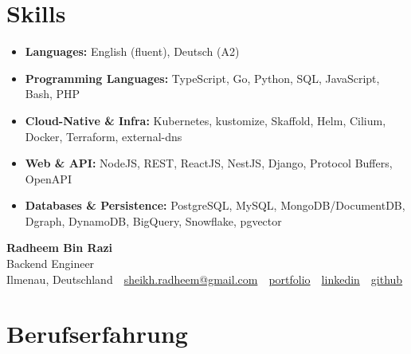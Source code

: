 \documentclass[11pt,a4paper]{resume}
\makeatletter
\newcommand{\Portfolio}{https://radheem.github.io/my-cv}
\newcommand{\PortfolioText}{portfolio}
\newcommand{\GitHub}{https://github.com/radheem}
\newcommand{\LinkedIn}{https://www.linkedin.com/in/radheem-razi}
\newcommand{\Email}{sheikh.radheem@gmail.com}
\makeatother
\begin{document}
\section{Skills}

\begin{itemize}[leftmargin=1.4em,nosep,topsep=2pt]
  \item \textbf{Languages:} English (fluent), Deutsch (A2)
  \item \textbf{Programming Languages:} TypeScript, Go, Python, SQL, JavaScript, Bash, PHP
  \item \textbf{Cloud-Native \& Infra:} Kubernetes, kustomize, Skaffold, Helm, Cilium, Docker, Terraform, external-dns
  \item \textbf{Web \& API:} NodeJS, REST, ReactJS, NestJS, Django, Protocol Buffers, OpenAPI
  \item \textbf{Databases \& Persistence:} PostgreSQL, MySQL, MongoDB/DocumentDB, Dgraph, DynamoDB, BigQuery, Snowflake, pgvector
\end{itemize}

\clearpage
{}

\begin{center}
  {\huge\bfseries Radheem Bin Razi}\\[3pt]
  {\large Backend Engineer}\\[6pt]
  \small
  Ilmenau, Deutschland \,\textbar\,
  \href{mailto:\Email}{\Email} \,\textbar\,
  \href{\Portfolio}{\PortfolioText} \,\textbar\,
  \href{\LinkedIn}{linkedin} \,\textbar\,
  \href{\GitHub}{github}
\end{center}
\vspace{2pt}

\section{Berufserfahrung}
\end{document}
